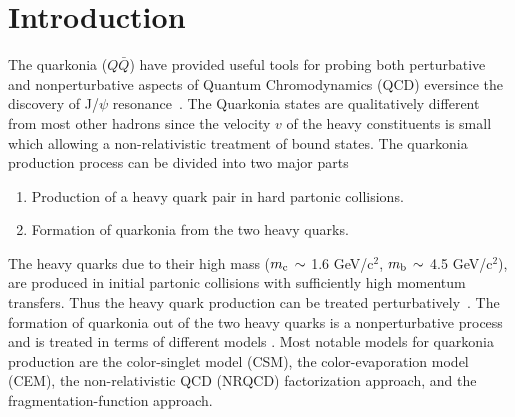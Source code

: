\documentclass[aps,prc,preprint,superscriptaddress,showpacs,showkeys,amsmath]{revtex4-1}
\begin{document}

\maketitle


\section{Introduction}

 The quarkonia ($Q\bar Q$) have provided useful tools for probing both 
perturbative and nonperturbative aspects of Quantum Chromodynamics (QCD) 
eversince the discovery of J/$\psi$ resonance~\cite{Augustin:1974xw,Aubert:1974js}. 
 The Quarkonia states are qualitatively different from most other hadrons since 
the velocity $v$ of the heavy constituents is small which allowing a 
non-relativistic treatment of bound states. The quarkonia production process 
can be divided into two major parts
\begin{enumerate}
\item Production of a heavy quark pair in hard partonic collisions.
\item Formation of quarkonia from the two heavy quarks.
\end{enumerate}
  The heavy quarks due to their high mass 
($m_{\rm c}\,\sim$ 1.6 GeV/c$^2$, $m_{\rm b}\,\sim$ 4.5 GeV/c$^2$), 
are produced in initial partonic collisions with sufficiently high momentum 
transfers. Thus the heavy quark production can be treated 
perturbatively~\cite{Nason:1987xz,Nason:1989zy}.
  The formation of quarkonia out of the two heavy quarks is a nonperturbative 
process and is treated in terms of different 
models \cite{Bodwin:1994jh,Brambilla:2004wf}. 
  Most notable models for quarkonia production are the color-singlet
model (CSM), the color-evaporation model (CEM), the non-relativistic QCD
(NRQCD) factorization approach, and the fragmentation-function approach.
\end{document}
